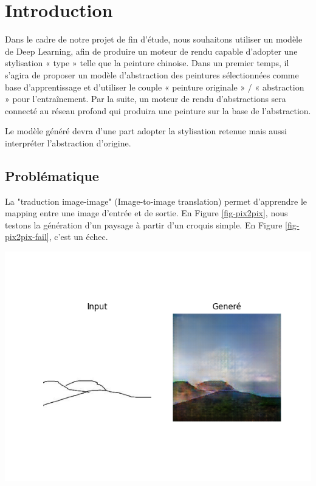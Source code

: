 \documentclass[a4paper, 12pt]{report}
\begin{document}
\chapter*{Introduction}


Dans le cadre de notre projet de fin d'étude, nous souhaitons utiliser un modèle de Deep Learning, afin de produire un moteur de rendu capable d’adopter une stylisation « type » telle que la peinture chinoise. Dans un premier temps, il s’agira de proposer un modèle d’abstraction des peintures sélectionnées comme base d’apprentissage et d’utiliser le couple « peinture originale » / « abstraction » pour l’entraînement. Par la suite, un moteur de rendu d’abstractions sera connecté au réseau profond qui produira une peinture sur la base de l’abstraction.

Le modèle généré devra d'une part adopter la stylisation retenue mais aussi interpréter l'abstraction d'origine.

\section{Problématique}

La "traduction image-image" (Image-to-image translation) permet d'apprendre le mapping entre une image d'entrée et de sortie. En Figure \ref{fig-pix2pix}, nous testons la génération d'un paysage à partir d'un croquis simple. En Figure \ref{fig-pix2pix-fail}, c'est un échec.

\begin{center}
\includegraphics[width=0.7\linewidth]{images/pix2pix-t1.png}
\label{fig-pix2pix}
\end{center}
\end{document}

